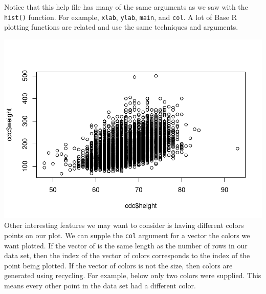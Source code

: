 \documentclass[
]{book}
\newenvironment{Shaded}{\begin{snugshade}}{\end{snugshade}}
\newcommand{\CommentTok}[1]{\textcolor[rgb]{0.56,0.35,0.01}{\textit{#1}}}
\newcommand{\DataTypeTok}[1]{\textcolor[rgb]{0.13,0.29,0.53}{#1}}
\newcommand{\KeywordTok}[1]{\textcolor[rgb]{0.13,0.29,0.53}{\textbf{#1}}}
\newcommand{\NormalTok}[1]{#1}
\newcommand{\OperatorTok}[1]{\textcolor[rgb]{0.81,0.36,0.00}{\textbf{#1}}}
\newcommand{\StringTok}[1]{\textcolor[rgb]{0.31,0.60,0.02}{#1}}
\begin{document}
Notice that this help file has many of the same arguments as we saw with the \texttt{hist()} function. For example, \texttt{xlab}, \texttt{ylab}, \texttt{main}, and \texttt{col}. A lot of Base R plotting functions are related and use the same techniques and arguments.

\begin{Shaded}
\end{Shaded}

\includegraphics{_main_files/figure-latex/unnamed-chunk-179-1.pdf}
Other interesting features we may want to consider is having different colors points on our plot. We can supple the \texttt{col} argument for a vector the colors we want plotted. If the vector of is the same length as the number of rows in our data set, then the index of the vector of colors corresponds to the index of the point being plotted. If the vector of colors is not the size, then colors are generated using recycling. For example, below only two colors were supplied. This means every other point in the data set had a different color.

\begin{Shaded}
\end{Shaded}
\end{document}
